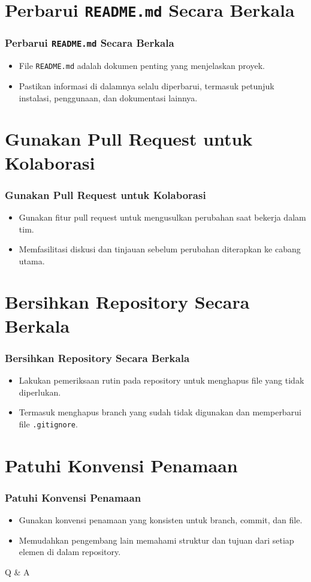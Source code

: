 \documentclass[aspectratio=169, table]{beamer}
\begin{document}
\section{Perbarui \texttt{README.md} Secara Berkala}
\begin{frame}[fragile]
	\frametitle{Perbarui \texttt{README.md} Secara Berkala}
	\begin{itemize}
		\item File \texttt{README.md} adalah dokumen penting yang menjelaskan proyek.
		\item Pastikan informasi di dalamnya selalu diperbarui, termasuk petunjuk instalasi, penggunaan, dan dokumentasi lainnya.
	\end{itemize}
\end{frame}

\section{Gunakan Pull Request untuk Kolaborasi}
\begin{frame}[fragile]
	\frametitle{Gunakan Pull Request untuk Kolaborasi}
	\begin{itemize}
		\item Gunakan fitur pull request untuk mengusulkan perubahan saat bekerja dalam tim.
		\item Memfasilitasi diskusi dan tinjauan sebelum perubahan diterapkan ke cabang utama.
	\end{itemize}
\end{frame}

\section{Bersihkan Repository Secara Berkala}
\begin{frame}[fragile]
	\frametitle{Bersihkan Repository Secara Berkala}
	\begin{itemize}
		\item Lakukan pemeriksaan rutin pada repository untuk menghapus file yang tidak diperlukan.
		\item Termasuk menghapus branch yang sudah tidak digunakan dan memperbarui file \texttt{.gitignore}.
	\end{itemize}
\end{frame}

\section{Patuhi Konvensi Penamaan}
\begin{frame}[fragile]
	\frametitle{Patuhi Konvensi Penamaan}
	\begin{itemize}
		\item Gunakan konvensi penamaan yang konsisten untuk branch, commit, dan file.
		\item Memudahkan pengembang lain memahami struktur dan tujuan dari setiap elemen di dalam repository.
	\end{itemize}
\end{frame}

\begin{frame}
	\centering
	\Huge Q \& A
\end{frame}
\end{document}
